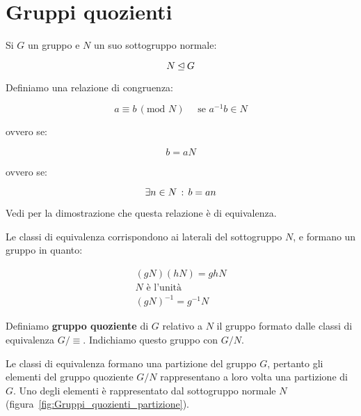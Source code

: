 \chapter{Gruppi quozienti}

Si $G$ un gruppo e $N$ un suo sottogruppo normale:

\begin{equation}
	N \unlhd G
\end{equation}

Definiamo una relazione di congruenza:

\begin{equation}
	a \equiv b \,(\text{mod } N) \quad \text{ se } a^{-1}b \in N
\end{equation}

ovvero se:

\begin{equation}
	b = aN
\end{equation}

ovvero se:

\begin{equation}
	\exists n \in N \,:\, b = an
\end{equation}

Vedi \cite[pag. 56]{jacobson} per la dimostrazione che questa relazione è di equivalenza.

Le classi di equivalenza corrispondono ai laterali del sottogruppo $N$, e formano un gruppo in quanto:

\begin{gather}
	(gN)(hN) = ghN \\
	N \text{ è l'unità} \\
	(gN)^{-1} = g^{-1}N
\end{gather}

Definiamo \textbf{gruppo quoziente} di $G$ relativo a $N$ il gruppo formato dalle classi di equivalenza $G/\equiv$. Indichiamo questo gruppo con $G/N$.

Le classi di equivalenza formano una partizione del gruppo $G$, pertanto gli elementi del gruppo quoziente $G/N$ rappresentano a loro volta una partizione di $G$. Uno degli elementi è rappresentato dal sottogruppo normale $N$ (figura~\ref{fig:Gruppi_quozienti_partizione}).

